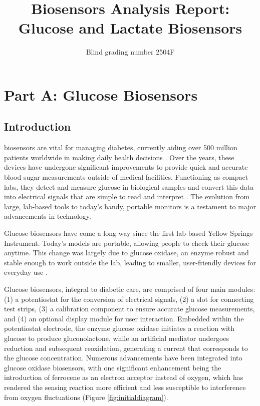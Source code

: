 \documentclass[conference]{IEEEtran}
\begin{document}
\title{Biosensors Analysis Report: Glucose and Lactate Biosensors}
\author{Blind grading number 2504F}
\maketitle

\section{Part A: Glucose Biosensors}
\subsection{Introduction}
 biosensors are vital for managing diabetes, currently aiding over 500 
million patients worldwide in making daily health decisions \cite{GlobalDiabetesCases}. Over the years, these devices
 have undergone significant improvements to provide quick and accurate blood sugar measurements outside of 
 medical facilities. Functioning as compact labs, they detect and measure glucose in biological samples
 and convert this data into electrical signals that are simple to read and interpret \cite{couletWhatBiosensor1991}. 
The evolution from large, lab-based tools to today's handy, portable monitors is a testament to major advancements in technology.

Glucose biosensors have come a long way since the first lab-based Yellow Springs Instrument\cite{chuaPlasmaGlucoseMeasurement1978}. Today's models are portable, 
allowing people to check their glucose anytime. This change was largely due to glucose oxidase, an enzyme robust and stable enough to 
work outside the lab, leading to smaller, user-friendly devices for everyday use \cite{clarkElectrodeSystemsContinuous1962}.

Glucose biosensors, integral to diabetic care, are comprised of four main modules: (1) a potentiostat for the conversion of electrical signals, 
(2) a slot for connecting test strips, (3) a calibration component to ensure accurate glucose measurements, and (4) an optional display module for user interaction. 
Embedded within the potentiostat electrode, the enzyme glucose oxidase initiates a reaction with glucose to produce gluconolactone, while an 
artificial mediator undergoes reduction and subsequent reoxidation, generating a current that corresponds to the glucose concentration. 
Numerous advancements have been integrated into glucose oxidase biosensors, with one significant enhancement being the introduction of ferrocene as an 
electron acceptor instead of oxygen, which has rendered the sensing reaction more efficient and less susceptible to interference from oxygen fluctuations 
(Figure \ref{fig:initialdiagram}).
\end{document}
